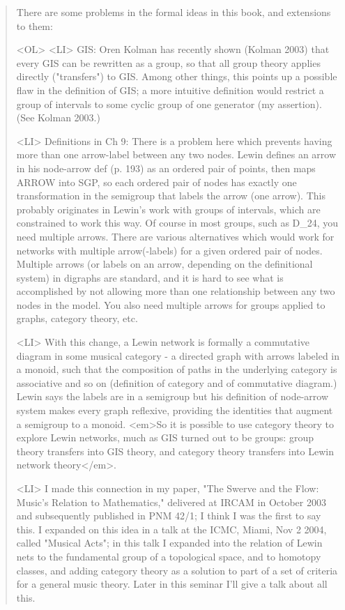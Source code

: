 \begin{quote}
There are some problems in the formal ideas in this book, and extensions 
to them:

<OL>
<LI>
GIS: Oren Kolman has recently shown (Kolman 2003) that every GIS can be 
rewritten as a group, so that all group theory applies directly 
("transfers") to GIS. Among other things, this points up a 
possible flaw in the definition of GIS; a more intuitive definition would 
restrict a group of intervals to some cyclic group of one generator 
(my assertion). (See Kolman 2003.)

<LI> Definitions in Ch 9: There is a problem here which prevents having 
more than one arrow-label between any two nodes. Lewin defines an arrow 
in his node-arrow def (p. 193) as an ordered pair of points, then maps 
ARROW into SGP, so each ordered pair of nodes has exactly one transformation 
in the semigroup that labels the arrow (one arrow).  This probably originates 
in Lewin's work with groups of intervals, which are constrained to work this 
way.  Of course in most groups, such as D_{24}, 
you need multiple arrows. 
There are various alternatives which would work for networks with multiple 
arrow(-labels) for a given ordered pair of nodes.  Multiple arrows (or 
labels on an arrow, depending on the definitional system) in digraphs are 
standard, and it is hard to see what is accomplished by not allowing 
more than one relationship between any two nodes in the model.  You 
also need multiple arrows for groups applied to graphs, category theory, etc.

<LI> 
With this change, a Lewin network is formally a commutative diagram in some
musical category - a directed graph with arrows labeled in a monoid, such 
that the composition of paths in the underlying category is associative and 
so on (definition of category and of commutative diagram.) Lewin says the 
labels are in a semigroup but his definition of node-arrow system makes 
every graph reflexive, providing the identities that augment a semigroup 
to a monoid. <em>So it is possible to use category theory to explore Lewin 
networks, much as GIS turned out to be 
groups: group theory transfers into GIS theory, and category theory 
transfers into Lewin network theory</em>.

<LI>
I made this connection in my paper, "The Swerve and the Flow: 
Music's Relation to Mathematics," delivered at IRCAM in 
October 2003 and subsequently published in PNM 42/1; I think I 
was the first to say this.  I expanded on this idea in a talk at 
the ICMC, Miami, Nov 2 2004, called "Musical Acts"; 
in this talk I expanded into the relation of Lewin nets to the 
fundamental group of a topological space, and to homotopy classes, and 
adding category theory as a solution to part of a set of criteria for 
a general music theory. Later in this seminar I'll give a talk about 
all this.
\end{quote}

